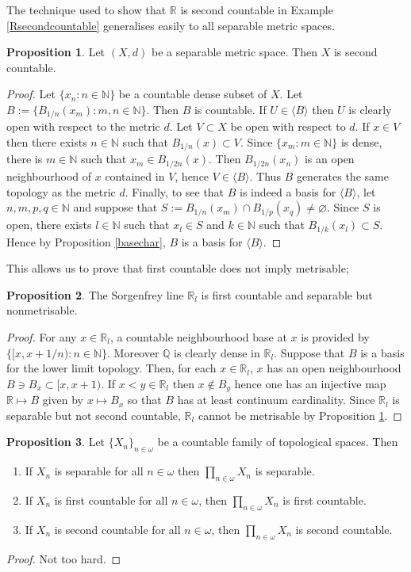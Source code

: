 \documentclass{book}
\theoremstyle{definition}
\newtheorem{proposition}{Proposition}[section]
\theoremstyle{remark}
\newcommand{\R}{\mathbb{R}}
\newcommand{\Q}{\mathbb{Q}}
\newcommand{\N}{\mathbb{N}}
\begin{document}
The technique used to show that $\R$ is second countable in Example \ref{Rsecondcountable} generalises easily to all separable metric spaces.

\begin{proposition}
\label{separablemetricsecondcountable}
Let $(X,d)$ be a separable metric space. Then $X$ is second countable.
\end{proposition}
\begin{proof}
Let $\{x_n:n\in\N\}$ be a countable dense subset of $X$. Let $B:=\{B_{1/n}(x_m):m,n\in\N\}$. Then $B$ is countable. If $U\in\langle B\rangle$ then $U$ is clearly open with respect to the metric $d$. Let $V\subset X$ be open with respect to $d$. If $x\in V$ then there exists $n\in\N$ such that $B_{1/n}(x)\subset V$. Since $\{x_m:m\in\N\}$ is dense, there is $m\in\N$ such that $x_m\in B_{1/2n}(x)$. Then $B_{1/2n}(x_n)$ is an open neighbourhood of $x$ contained in $V$, hence $V\in\langle B\rangle$. Thus $B$ generates the same topology as the metric $d$. Finally, to see that $B$ is indeed a basis for $\langle B\rangle$, let $n,m,p,q\in\N$ and suppose that $S:=B_{1/n}(x_m)\cap B_{1/p}(x_q)\neq\varnothing$. Since $S$ is open, there exists $l\in\N$ such that $x_l\in S$ and $k\in\N$ such that $B_{1/k}(x_l)\subset S$. Hence by Proposition \ref{basechar}, $B$ is a basis for $\langle B\rangle$.
\end{proof}

This allows us to prove that first countable does not imply metrisable;
\begin{proposition}
The Sorgenfrey line $\R_l$ is first countable and separable but nonmetrisable.
\end{proposition}
\begin{proof}
For any $x\in\R_l$, a countable neighbourhood base at $x$ is provided by $\{[x, x+1/n):n\in\N\}$. Moreover $\Q$ is clearly dense in $\R_l$. Suppose that $B$ is a basis for the lower limit topology. Then, for each $x\in\R_l$, $x$ has an open neighbourhood $B\ni B_x\subset [x,x+1)$. If $x<y\in\R_l$ then $x\notin B_y$ hence one has an injective map $\R\mapsto B$ given by $x\mapsto B_x$ so that $B$ has at least continuum cardinality. Since $\R_l$ is separable but not second countable, $\R_l$ cannot be metrisable by Proposition \ref{separablemetricsecondcountable}.
\end{proof}


\begin{proposition}
Let $\{X_n\}_{n\in\omega}$ be a countable family of topological spaces. Then
\begin{enumerate}
    \item If $X_n$ is separable for all $n\in\omega$ then $\prod_{n\in\omega}X_n$ is separable.
    \item If $X_n$ is first countable for all $n\in\omega$, then $\prod_{n\in\omega}X_n$ is first countable.
    \item If $X_n$ is second countable for all $n\in\omega$, then $\prod_{n\in\omega}X_n$ is second countable.
\end{enumerate}
\end{proposition}
\begin{proof}
Not too hard.
\end{proof}
\end{document}
